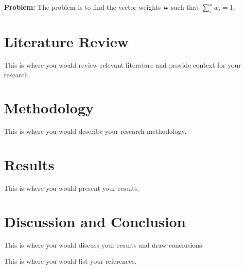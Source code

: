 \documentclass{article}
\begin{document}
\textbf{Problem: }
The problem is to find the vector weights $\mathbf{w}$ such that $\sum_{i}^{n} {w_i} = 1$.




\section{Literature Review}
This is where you would review relevant literature and provide context for your research.

\section{Methodology}
This is where you would describe your research methodology.

\section{Results}
This is where you would present your results.

\section{Discussion and Conclusion}
This is where you would discuss your results and draw conclusions.

\begin{thebibliography}{99}
This is where you would list your references.
\end{thebibliography}
\end{document}
